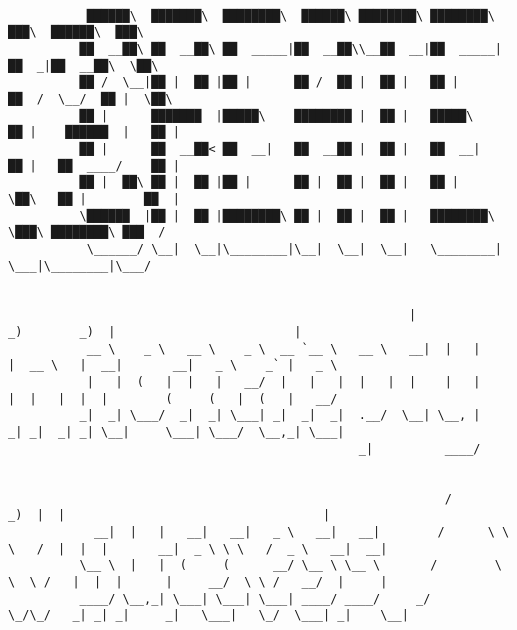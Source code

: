 \documentclass[varwidth=\maxdimen,margin=0.5cm,multi={verbatim}]{standalone}
\begin{document}
\begin{verbatim}

           ██████\  ███████\  ████████\  ██████\ ████████\ ████████\      ███\  ██████\  ███\
          ██  __██\ ██  __██\ ██  _____|██  __██\\__██  __|██  _____|    ██  _|██  __██\  \██\
          ██ /  \__|██ |  ██ |██ |      ██ /  ██ |  ██ |   ██ |         ██  /  \__/  ██ |  \██\
          ██ |      ███████  |█████\    ████████ |  ██ |   █████\       ██ |    ██████  |   ██ |
          ██ |      ██  __██< ██  __|   ██  __██ |  ██ |   ██  __|      ██ |   ██  ____/    ██ |
          ██ |  ██\ ██ |  ██ |██ |      ██ |  ██ |  ██ |   ██ |         \██\   ██ |        ██  |
          \██████  |██ |  ██ |████████\ ██ |  ██ |  ██ |   ████████\     \███\ ████████\ ███  /
           \______/ \__|  \__|\________|\__|  \__|  \__|   \________|      \___|\________|\___/


                                                        |              _)        _)  |                         |
           __ \    _ \   __ \    _ \  __ `__ \   __ \   __|  |   |      |  __ \   |  __|       __|   _ \    _` |   _ \
           |   |  (   |  |   |   __/  |   |   |  |   |  |    |   |      |  |   |  |  |        (     (   |  (   |   __/
          _|  _| \___/  _|  _| \___| _|  _|  _|  .__/  \__| \__, |     _| _|  _| _| \__|     \___| \___/  \__,_| \___|
                                                 _|          ____/


                                                             /                _)  |  |                                    |
            __|  |   |   __|   __|   _ \   __|   __|        /      \ \  \   /  |  |  |       __|  _ \ \ \   /  _ \   __|  __|
          \__ \  |   |  (     (      __/ \__ \ \__ \       /        \ \  \ /   |  |  |      |     __/  \ \ /   __/  |     |
          ____/ \__,_| \___| \___| \___| ____/ ____/     _/          \_/\_/   _| _| _|     _|   \___|   \_/  \___| _|    \__|



\end{verbatim}
\end{document}
